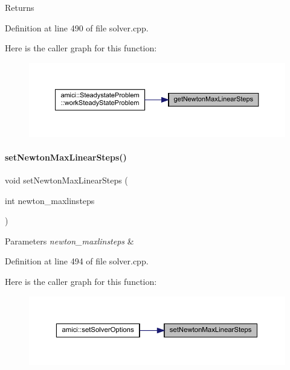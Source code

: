 \begin{DoxyReturn}{Returns}

\end{DoxyReturn}


Definition at line 490 of file solver.\+cpp.

Here is the caller graph for this function\+:
\nopagebreak
\begin{figure}[H]
\begin{center}
\leavevmode
\includegraphics[width=350pt]{classamici_1_1_solver_a874c929a78d0e2af11c62ba958e1b3d1_icgraph}
\end{center}
\end{figure}
\mbox{\label{classamici_1_1_solver_af9143ab28630d5db394f641df0a8e477}} 
\paragraph{\texorpdfstring{setNewtonMaxLinearSteps()}{setNewtonMaxLinearSteps()}}
{\footnotesize\ttfamily void set\+Newton\+Max\+Linear\+Steps (\begin{DoxyParamCaption}\item[{int}]{newton\+\_\+maxlinsteps }\end{DoxyParamCaption})}


\begin{DoxyParams}{Parameters}
{\em newton\+\_\+maxlinsteps} & \\
\hline
\end{DoxyParams}


Definition at line 494 of file solver.\+cpp.

Here is the caller graph for this function\+:
\nopagebreak
\begin{figure}[H]
\begin{center}
\leavevmode
\includegraphics[width=350pt]{classamici_1_1_solver_af9143ab28630d5db394f641df0a8e477_icgraph}
\end{center}
\end{figure}
\mbox{\label{classamici_1_1_solver_affde3089fec2a1cca40d6cc0c4c2cf1d}} 
